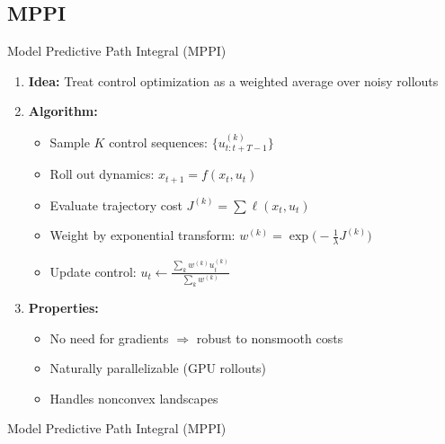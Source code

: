\documentclass[10pt, aspectratio=169]{beamer}
\begin{document}
\subsection{MPPI}
\begin{frame}{Model Predictive Path Integral (MPPI)\,\footnotemark[1]}
  \begin{enumerate}
    \item \textbf{Idea:}  
    Treat control optimization as a weighted average over noisy rollouts

    \item \textbf{Algorithm:}  
    \begin{itemize}
      \item Sample $K$ control sequences: $\{u_{t:t+T-1}^{(k)}\}$
      \item Roll out dynamics: $x_{t+1}=f(x_t,u_t)$
      \item Evaluate trajectory cost $J^{(k)} = \sum \ell(x_t,u_t)$
      \item Weight by exponential transform:  
      $w^{(k)} = \exp\!\Big(-\tfrac{1}{\lambda} J^{(k)}\Big)$
      \item Update control:  
      $u_t \leftarrow \frac{\sum_k w^{(k)} u_t^{(k)}}{\sum_k w^{(k)}}$
    \end{itemize}

    \item \textbf{Properties:}  
    \begin{itemize}
      \item No need for gradients $\Rightarrow$ robust to nonsmooth costs
      \item Naturally parallelizable (GPU rollouts)
      \item Handles nonconvex landscapes
    \end{itemize}
  \end{enumerate}

\end{frame}

\begin{frame}{Model Predictive Path Integral (MPPI)}
\end{frame}

\end{document}

